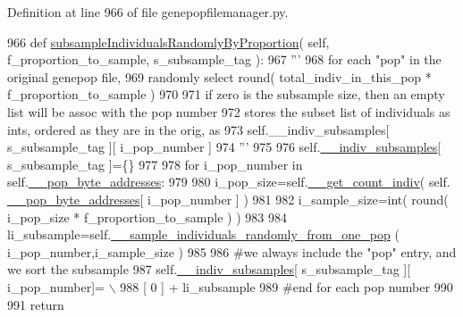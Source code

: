 Definition at line 966 of file genepopfilemanager.\+py.


\begin{DoxyCode}
966     \textcolor{keyword}{def }\hyperlink{classnegui_1_1genepopfilemanager_1_1GenepopFileManager_a5c85ac4838fd6919be1c408bcd39f54e}{subsampleIndividualsRandomlyByProportion}( self, 
      f\_proportion\_to\_sample, s\_subsample\_tag ):
967         \textcolor{stringliteral}{'''}
968 \textcolor{stringliteral}{        for each "pop" in the original genepop file,}
969 \textcolor{stringliteral}{        randomly select round( total\_indiv\_in\_this\_pop * f\_proportion\_to\_sample )}
970 \textcolor{stringliteral}{        }
971 \textcolor{stringliteral}{        if zero is the subsample size, then an empty list will be assoc with the pop number}
972 \textcolor{stringliteral}{        stores the subset list of individuals as ints, ordered as they are in the orig, as      }
973 \textcolor{stringliteral}{        self.\_\_indiv\_subsamples[ s\_subsample\_tag ][ i\_pop\_number ]}
974 \textcolor{stringliteral}{        '''}
975 
976         self.\hyperlink{classnegui_1_1genepopfilemanager_1_1GenepopFileManager_a1e8379bcee4902ca9314ff53fcb71644}{\_\_indiv\_subsamples}[ s\_subsample\_tag ]=\{\}
977 
978         \textcolor{keywordflow}{for} i\_pop\_number \textcolor{keywordflow}{in} self.\hyperlink{classnegui_1_1genepopfilemanager_1_1GenepopFileManager_ae24c2bdd19136a345bdb42fd49c5d91f}{\_\_pop\_byte\_addresses}:
979 
980             i\_pop\_size=self.\hyperlink{classnegui_1_1genepopfilemanager_1_1GenepopFileManager_ac7cc98fe56efee82b4ffd4dc816a4704}{\_\_get\_count\_indiv}( self.
      \hyperlink{classnegui_1_1genepopfilemanager_1_1GenepopFileManager_ae24c2bdd19136a345bdb42fd49c5d91f}{\_\_pop\_byte\_addresses}[ i\_pop\_number ] )
981 
982             i\_sample\_size=int( round( i\_pop\_size * f\_proportion\_to\_sample ) )
983 
984             li\_subsample=self.\hyperlink{classnegui_1_1genepopfilemanager_1_1GenepopFileManager_a9818467c9cb40f8e1de0c6cc7f52e263}{\_\_sample\_individuals\_randomly\_from\_one\_pop}
      ( i\_pop\_number,i\_sample\_size )
985 
986             \textcolor{comment}{#we always include the "pop" entry, and we sort the subsample}
987             self.\hyperlink{classnegui_1_1genepopfilemanager_1_1GenepopFileManager_a1e8379bcee4902ca9314ff53fcb71644}{\_\_indiv\_subsamples}[ s\_subsample\_tag ][ i\_pop\_number]= \(\backslash\)
988                      [ 0 ] +  li\_subsample
989         \textcolor{comment}{#end for each pop number}
990 
991         \textcolor{keywordflow}{return}
\end{DoxyCode}
